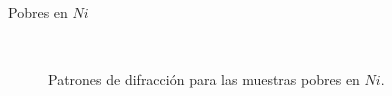 \documentclass[11pt]{beamer}
\begin{document}
\begin{frame}{Pobres en $Ni$}
\begin{figure}[H]
				 \\
				\caption{Patrones de difracción para las muestras pobres en $Ni$.}
				\label{RXNiPoor}
			\end{figure}		
		\end{frame}
		
\end{document}
